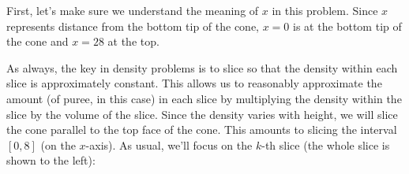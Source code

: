 \documentclass{article}
\begin{document}
\begin{enumerate}
    \begin{solution}
    First, let's make sure we understand the meaning of $x$ in this
    problem.  Since $x$ represents distance from the bottom tip of the cone, $x = 0$ is at
    the bottom tip of the cone and $x = 28$ at the top.

    As always, the key in density problems is to slice so that the density
    within each slice is approximately constant.  This allows us to
    reasonably approximate the amount (of puree, in this case) in each
    slice by multiplying the density within the slice by the volume of the
    slice.  Since the density varies with height, we will slice the cone
    parallel to the top face of the cone.  This amounts to slicing the interval $[0, 8]$
    (on the $x$-axis).  As usual, we'll focus on the $k$-th slice (the
    whole slice is shown to the left):
    \begin{center}
      \begin{tikzpicture}[x=0.5cm, y=0.5cm]


\end{tikzpicture}
\end{center}
\end{solution}
\end{enumerate}
\end{document}
